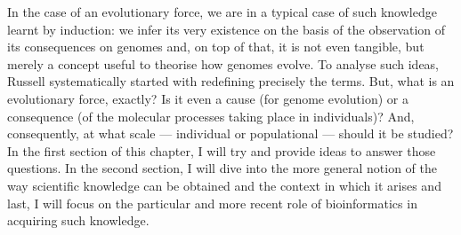 
In the case of an evolutionary force, we are in a typical case of such knowledge learnt by induction: 
we infer its very existence on the basis of the observation of its consequences on genomes and, on top of that, it is not even tangible, but merely a concept useful to theorise how genomes evolve.
To analyse such ideas, Russell systematically started with redefining precisely the terms.
But, what is an evolutionary force, exactly? Is it even a cause (for genome evolution) or a consequence (of the molecular processes taking place in individuals)? And, consequently, at what scale — individual or populational — should it be studied?
In the first section of this chapter, I will try and provide ideas to answer those questions.
In the second section, I will dive into the more general notion of the way scientific knowledge can be obtained and the context in which it arises and last, I will focus on the particular and more recent role of bioinformatics in acquiring such knowledge.



%

